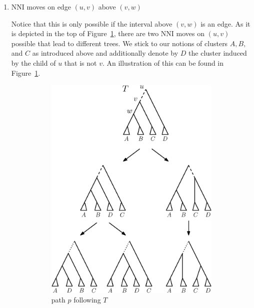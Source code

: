 \documentclass{amsart}
\newcommand{\nni}{\mathrm{NNI}}
\begin{document}
\begin{enumerate}
    \item $\nni$ moves on edge $(u,v)$ above $(v,w)$

    Notice that this is only possible if the interval above $(v,w)$ is an edge.
    As it is depicted in the top of Figure~\ref{fig:thm_fp_nni2a}, there are two $\nni$ moves on $(u,v)$ possible that lead to different trees.
    We stick to our notions of clusters $A,B,$ and $C$ as introduced above and additionally denote by $D$ the cluster induced by the child of $u$ that is not $v$.
    An illustration of this can be found in Figure~\ref{fig:thm_fp_nni2a}.

    \begin{figure}[H]
        \begin{subfigure}[b]{.45\textwidth}
            \centering
            \includegraphics[width=0.9\linewidth]{thm_fp_nni2a.eps}
            \vspace{12pt}
            \caption{path $p$ following $T$}
            \label{fig:thm_fp_nni2a}
        \end{subfigure}
        \begin{subfigure}[b]{.45\textwidth}
            \centering

\end{subfigure}
\end{figure}
\end{enumerate}
\end{document}
